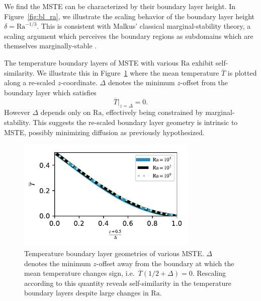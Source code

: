 \documentclass[reprint,amsmath,amssymb,aps,nofootinbib]{revtex4-1}
\newcommand\Ra{\mathrm{Ra}}
\begin{document}
We find the MSTE can be characterized by their boundary layer height.
In Figure~\ref{fig:bl_ra}, we illustrate the scaling behavior of the boundary layer height $\delta = \Ra^{-1/3}$. 
This is consistent with Malkus' classical marginal-stability theory, a scaling argument which perceives the boundary regions as subdomains which are themselves marginally-stable \cite{Malkus_1954}.

The temperature boundary layers of MSTE with various $\Ra$ exhibit self-similarity. 
We illustrate this in Figure~\ref{fig:b0_delta} where the mean temperature $\overline{T}$ is plotted along a re-scaled $z$-coordinate.
$\Delta$ denotes the minimum $z$-offset from the boundary layer which satisfies
\begin{equation*}
    \overline{T}|_{z = \Delta} = 0.
\end{equation*}
However $\Delta$ depends only on $\Ra$, effectively being constrained by marginal-stability.
This suggests the re-scaled boundary layer geometry is intrinsic to MSTE, possibly minimizing diffusion as previously hypothesized.

\begin{figure}
    \centering
    \includegraphics[width=3.4in]{b0_delta.pdf}
    \caption{Temperature boundary layer geometries of various MSTE. 
    $\Delta$ denotes the minimum $z$-offset away from the boundary at which the mean temperature changes sign, i.e.~$\overline{T}(1/2 + \Delta) = 0$. 
    Rescaling according to this quantity reveals self-similarity in the temperature boundary layers despite large changes in $\Ra$.}
    \label{fig:b0_delta}
\end{figure}
\end{document}
